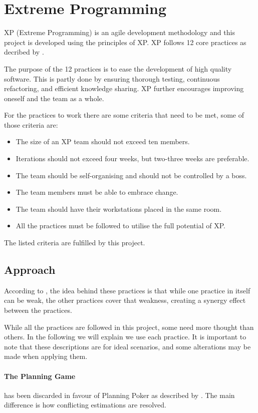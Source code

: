 \section{Extreme Programming}
XP (Extreme Programming) is an agile development methodology and this project is developed using the principles of XP. XP follows 12 core practices as decribed by \citet[p. 54]{xp:explained}.

The purpose of the 12 practices is to ease the development of high quality software. This is partly done by ensuring thorough testing, continuous refactoring, and efficient knowledge sharing. XP further encourages improving oneself and the team as a whole.

For the practices to work there are some criteria that need to be met, some of those criteria are:
\begin{itemize}
\item The size of an XP team should not exceed ten members.
\item Iterations should not exceed four weeks, but two-three weeks are preferable.
\item The team should be self-organising and should not be controlled by a boss.
\item The team members must be able to embrace change.
\item The team should have their workstations placed in the same room.
\item All the practices must be followed to utilise the full potential of XP.
\end{itemize}

The listed criteria are fulfilled by this project.

\subsection{Approach}
According to \citet[p. 53]{xp:explained}, the idea behind these practices is that while one practice in itself can be weak, the other practices cover that weakness, creating a synergy effect between the practices.

While all the practices are followed in this project, some need more thought than others. In the following we will explain we use each practice. It is important to note that these descriptions are for ideal scenarios, and some alterations may be made when applying them.

\paragraph{The Planning Game} has been discarded in favour of Planning Poker as described by \citet{xp:planningPoker}.
The main difference is how conflicting estimations are resolved. 

